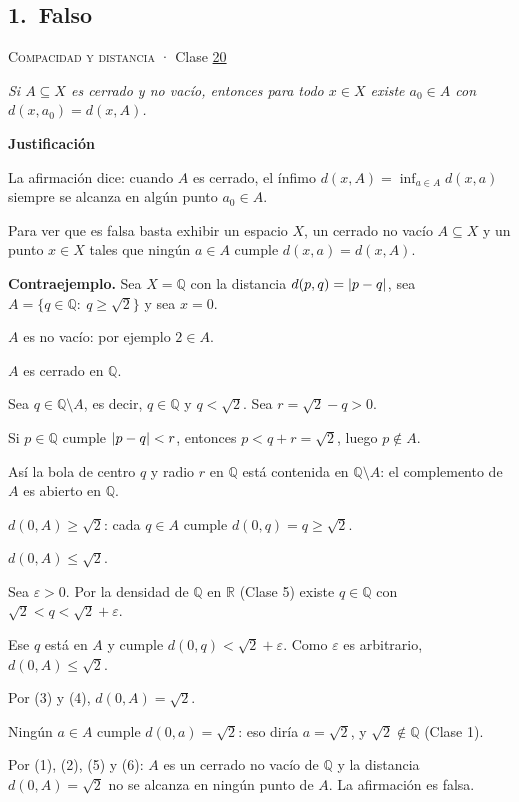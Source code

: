 \documentclass[11pt,a4paper]{article}
\newcommand{\R}{\mathbb{R}}\newcommand{\N}{\mathbb{N}}\newcommand{\Q}{\mathbb{Q}}
\providecommand{\lt}{<}\providecommand{\gt}{>}
\newcommand{\bloque}[1]{\par\smallskip\noindent\textbf{\color{acento}#1}\par}
\begin{document}
\subsection*{\hypertarget{r-1}{}1.\ \textcolor{bad}{Falso}}
{\small \textsc{Compacidad y distancia} · Clase \href{https://decostruttivismo.github.io/MAT2514-repaso/pdf/MAT2514_apuntes_completos.pdf\#nameddest=section.20}{20}}\par
\emph{Si $A\subseteq X$ es cerrado y no vacío, entonces para todo $x\in X$ existe $a_0\in A$ con $d(x,a_0)=d(x,A)$.}
\bloque{Justificación}
\begin{pasos}
\item[] La afirmación dice: cuando $A$ es cerrado, el ínfimo $d(x,A)=\inf_{a\in A}d(x,a)$ siempre se alcanza en algún punto $a_0\in A$.
\item[] Para ver que es falsa basta exhibir un espacio $X$, un cerrado no vacío $A\subseteq X$ y un punto $x\in X$ tales que ningún $a\in A$ cumple $d(x,a)=d(x,A)$.
\item[] \textbf{Contraejemplo.} Sea $X=\Q$ con la distancia $d(p,q)=\lvert p-q\rvert$, sea $A=\{q\in\Q:\ q\ge\sqrt2\}$ y sea $x=0$.
\item[(1)] $A$ es no vacío: por ejemplo $2\in A$.
\item[(2)] $A$ es cerrado en $\Q$.
\begin{subpasos}
\item Sea $q\in\Q\setminus A$, es decir, $q\in\Q$ y $q\lt \sqrt2$. Sea $r=\sqrt2-q\gt 0$.
\item Si $p\in\Q$ cumple $\abs{p-q}\lt r$, entonces $p\lt q+r=\sqrt2$, luego $p\notin A$.
\item Así la bola de centro $q$ y radio $r$ en $\Q$ está contenida en $\Q\setminus A$: el complemento de $A$ es abierto en $\Q$.
\end{subpasos}
\item[(3)] $d(0,A)\ge\sqrt2$: cada $q\in A$ cumple $d(0,q)=q\ge\sqrt2$.
\item[(4)] $d(0,A)\le\sqrt2$.
\begin{subpasos}
\item Sea $\varepsilon\gt 0$. Por la densidad de $\Q$ en $\R$ (Clase 5) existe $q\in\Q$ con $\sqrt2\lt q\lt \sqrt2+\varepsilon$.
\item Ese $q$ está en $A$ y cumple $d(0,q)\lt \sqrt2+\varepsilon$. Como $\varepsilon$ es arbitrario, $d(0,A)\le\sqrt2$.
\end{subpasos}
\item[(5)] Por (3) y (4), $d(0,A)=\sqrt2$.
\item[(6)] Ningún $a\in A$ cumple $d(0,a)=\sqrt2$: eso diría $a=\sqrt2$, y $\sqrt2\notin\Q$ (Clase 1).
\item[] Por (1), (2), (5) y (6): $A$ es un cerrado no vacío de $\Q$ y la distancia $d(0,A)=\sqrt2$ no se alcanza en ningún punto de $A$. La afirmación es falsa.
\end{pasos}
\end{document}
